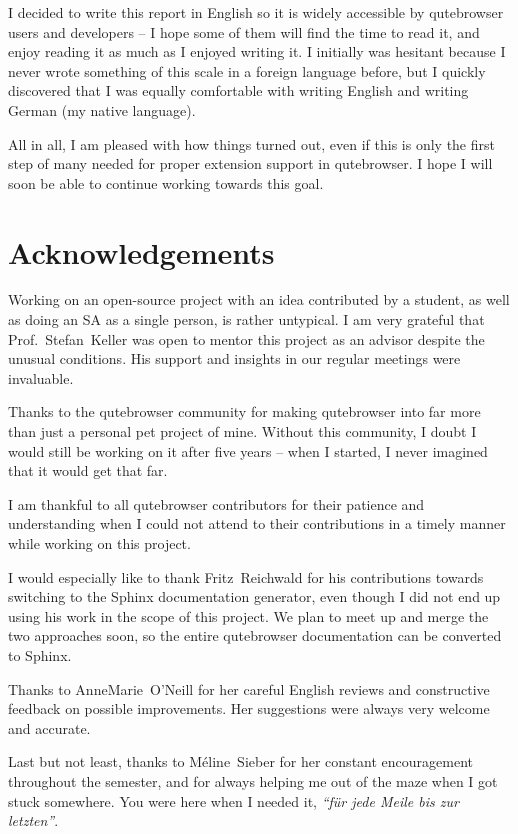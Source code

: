 I decided to write this report in English so it is widely accessible by
qutebrowser users and developers -- I hope some of them will find the time to
read it, and enjoy reading it as much as I enjoyed writing it. I initially was
hesitant because I never wrote something of this scale in a foreign language
before, but I quickly discovered that I was equally comfortable with writing
English and writing German (my native language).

All in all, I am pleased with how things turned out, even if this is only the
first step of many needed for proper extension support in qutebrowser. I hope I
will soon be able to continue working towards this goal.

\section{Acknowledgements}
Working on an open-source project with an idea contributed by a student, as well
as doing an SA as a single person, is rather untypical. I am very grateful that
Prof.~Stefan~Keller was open to mentor this project as an advisor despite the
unusual conditions. His support and insights in our regular meetings were
invaluable.

Thanks to the qutebrowser community for making qutebrowser into far more than
just a personal pet project of mine. Without this community, I doubt I would
still be working on it after five years -- when I started, I never imagined that
it would get that far.

I am thankful to all qutebrowser contributors for their patience and
understanding when I could not attend to their contributions in a timely manner
while working on this project.

I would especially like to thank Fritz~Reichwald for his contributions towards
switching to the Sphinx documentation generator, even though I did not end up
using his work in the scope of this project. We plan to meet up and merge the
two approaches soon, so the entire qutebrowser documentation can be converted to
Sphinx.

Thanks to AnneMarie~O'Neill for her careful English reviews and constructive
feedback on possible improvements. Her suggestions were always very welcome and
accurate.

Last but not least, thanks to Méline~Sieber for her constant encouragement
throughout the semester, and for always helping me out of the maze when I got
stuck somewhere. You were here when I needed it, \emph{``für jede Meile bis zur
letzten''}.


